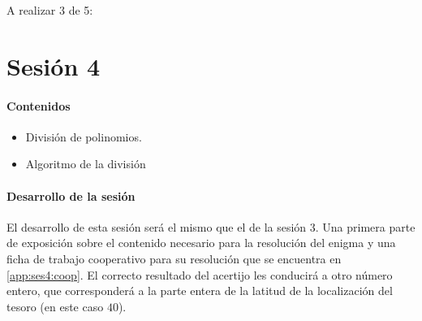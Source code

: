 \newbloq A realizar 3 de 5:









\section{Sesión 4}\label{app:ses_comp:4}

\paragraph{Contenidos}
\begin{itemize}
	\item División de polinomios.
	\item Algoritmo de la división
\end{itemize}

\paragraph{Desarrollo de la sesión}

El desarrollo de esta sesión será el mismo que el de la sesión 3.
%
Una primera parte de exposición sobre el contenido necesario para la resolución del enigma y una ficha de trabajo cooperativo para su resolución que se encuentra en \ref{app:ses4:coop}.
%
El correcto resultado del acertijo les conducirá a otro número entero, que corresponderá a la parte entera de la latitud de la localización del tesoro (en este caso $40$).

